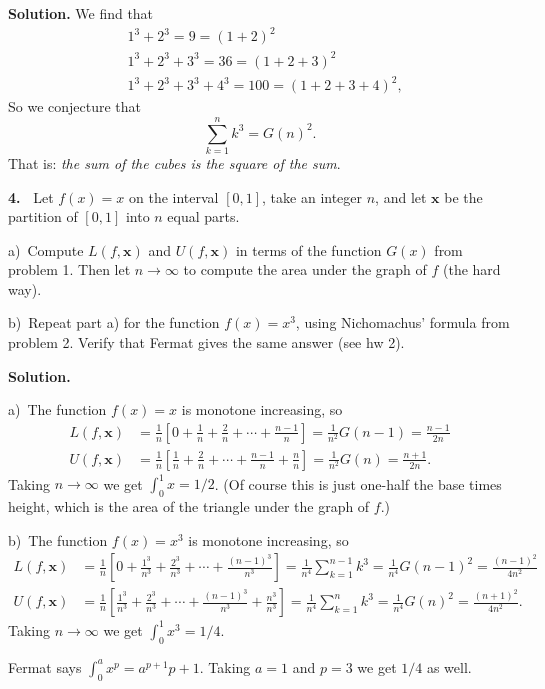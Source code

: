 \documentclass[12pt]{article}
\theoremstyle{definition}
\theoremstyle{remark}
\theoremstyle{definition}
\newenvironment{Solution}{\noindent\textbf{Solution.}}{}
\newcommand{\bx}{\mathbf x}
\begin{document}
\begin{Solution} We find that 
\[\begin{split}&1^3+2^3=9=(1+2)^2\\
&1^3+2^3+3^3=36=(1+2+3)^2\\
&1^3+2^3+3^3+4^3=100=(1+2+3+4)^2,
\end{split}
\]
So we conjecture that 
\[\sum_{k=1}^n k^3=G(n)^2.\]
That is: {\it the sum of the cubes is the square of the sum}. 

\end{Solution}

\vskip10pt 

{\bf 4.\ } Let $f(x)=x$ on the interval $[0,1]$, take an integer $n$, and let  $\bx$ be the partition of $[0,1]$ into $n$ equal parts.  

a)\ Compute $L(f,\bx)$ and $U(f,\bx)$ in terms of the function $G(x)$ from problem 1. Then let $n\to \infty$ to compute the area under the graph of $f$ (the hard way).  

b)\ Repeat part a) for the function $f(x)=x^3$, using Nichomachus' formula from problem 2.  Verify that Fermat gives the same answer (see hw 2). 

\begin{Solution} 

a)\ The function $f(x)=x$ is monotone increasing, so 
\[\begin{split}
L(f,\bx)&=\frac{1}{n}\left[0+\frac{1}{n}+\frac{2}{n}+\cdots+\frac{n-1}{n}\right]=\frac{1}{n^2}G(n-1)=\frac{n-1}{2n}\\
U(f,\bx)&=\frac{1}{n}\left[\frac{1}{n}+\frac{2}{n}+\cdots+\frac{n-1}{n}+\frac{n}{n}\right]=\frac{1}{n^2}G(n)=\frac{n+1}{2n}.
\end{split}
\]
Taking $n\to\infty$ we get $\int_0^1 x=1/2$. (Of course this is just one-half the base times height, which is the area of the triangle under the graph of $f$.)

b)\ The function $f(x)=x^3$ is monotone increasing, so 
\[\begin{split}
L(f,\bx)&
=\frac{1}{n}\left[0+\frac{1^3}{n^3}+\frac{2^3}{n^3}+\cdots+\frac{(n-1)^3}{n^3}\right]
=\frac{1}{n^4}\sum_{k=1}^{n-1}k^3=\frac{1}{n^4}G(n-1)^2=\frac{(n-1)^2}{4n^2}\\
U(f,\bx)&
=\frac{1}{n}\left[\frac{1^3}{n^3}+\frac{2^3}{n^3}+\cdots+\frac{(n-1)^3}{n^3}+\frac{n^3}{n^3}\right]
=\frac{1}{n^4}\sum_{k=1}^{n}k^3=\frac{1}{n^4}G(n)^2=\frac{(n+1)^2}{4n^2}.
\end{split}
\]
Taking $n\to\infty$ we get $\int_0^1 x^3=1/4$. 

Fermat says $\int_0^a x^p=a^{p+1}{p+1}$. Taking $a=1$ and $p=3$ we get $1/4$ as well. 

\end{Solution}
\end{document}
